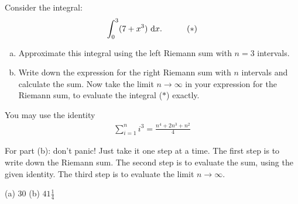 \begin{question}[2016Q1]
Consider the integral:
\begin{align*}
   \int_0^3 (7 + x^3) \,\,\mathrm{d}x . ~~~~~~~~~ (*)
\end{align*}
\begin{enumerate} [(a)]
\item
   Approximate this integral using the left Riemann sum with $n=3$ intervals.
\item
    Write down the expression for the right Riemann sum with $n$
intervals and calculate the sum. Now take the limit $n \to \infty$
in your expression for the Riemann sum, to evaluate the integral
($*$) exactly.
\end{enumerate}
You may use the identity
\begin{align*}
\sum_{i=1}^{n} i^3 = \frac{n^4 +2n^3 + n^2}{4}
\end{align*}
\end{question}

\begin{hint}
For part (b): don't panic! Just take it one step at a time.
The first step is to write down the Riemann sum.
The second step is to evaluate the sum, using the given identity.
The third step is to evaluate the limit $n\rightarrow\infty$.
\end{hint}

\begin{answer}
(a) $30$
\qquad (b) $41 \frac{1}{4}$
\end{answer}

